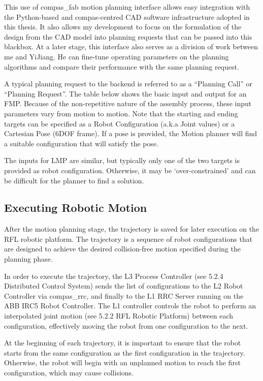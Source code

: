 This use of compas_fab motion planning interface allows easy integration with the Python-based and compas-centred CAD software infrastructure adopted in this thesis. It also allows my development to focus on the formulation of the design from the CAD model into planning requests that can be passed into this blackbox. At a later stage, this interface also serves as a division of work between me and YiJiang. He can fine-tune operating parameters on the planning algorithms and compare their performance with the same planning request.

A typical planning request to the backend is referred to as a “Planning Call” or “Planning Request”. The table below shows the basic input and output for an FMP. Because of the non-repetitive nature of the assembly process, these input parameters vary from motion to motion. Note that the starting and ending targets can be specified as a Robot Configuration (a.k.a Joint values) or a Cartesian Pose (6DOF frame). If a pose is provided, the Motion planner will find a suitable configuration that will satisfy the pose.

The inputs for LMP are similar, but typically only one of the two targets is provided as robot configuration. Otherwise, it may be ‘over-constrained’ and can be difficult for the planner to find a solution.


\subsection{Executing Robotic Motion}

After the motion planning stage, the trajectory is saved for later execution on the RFL robotic platform. The trajectory is a sequence of robot configurations that are designed to achieve the desired collision-free motion specified during the planning phase.

In order to execute the trajectory, the L3 Process Controller (see 5.2.4 Distributed Control System) sends the list of configurations to the L2 Robot Controller via compas_rrc, and finally to the L1 RRC Server running on the ABB IRC5 Robot Controller. The L1 controller controls the robot to perform an interpolated joint motion (see 5.2.2 RFL Robotic Platform) between each configuration, effectively moving the robot from one configuration to the next.

At the beginning of each trajectory, it is important to ensure that the robot starts from the same configuration as the first configuration in the trajectory. Otherwise, the robot will begin with an unplanned motion to reach the first configuration, which may cause collisions.

